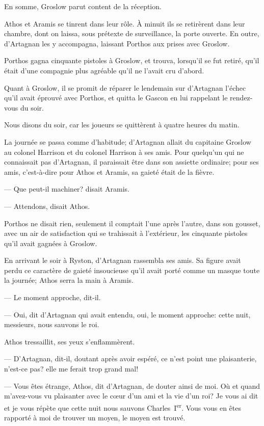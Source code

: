 En somme, Groslow parut content de la réception.

Athos et Aramis se tinrent dans leur rôle. À minuit ils se retirèrent dans leur chambre, dont on laissa, sous prétexte de surveillance, la porte ouverte. En outre, d'Artagnan les y accompagna, laissant Porthos aux prises avec Groslow.

Porthos gagna cinquante pistoles à Groslow, et trouva, lorsqu'il se fut retiré, qu'il était d'une compagnie plus agréable qu'il ne l'avait cru d'abord.

Quant à Groslow, il se promit de réparer le lendemain sur d'Artagnan l'échec qu'il avait éprouvé avec Porthos, et quitta le Gascon en lui rappelant le rendez-vous du soir.

Nous disons du soir, car les joueurs se quittèrent à quatre heures du matin.

La journée se passa comme d'habitude; d'Artagnan allait du capitaine Groslow au colonel Harrison et du colonel Harrison à ses amis. Pour quelqu'un qui ne connaissait pas d'Artagnan, il paraissait être dans son assiette ordinaire; pour ses amis, c'est-à-dire pour Athos et Aramis, sa gaieté était de la fièvre.

— Que peut-il machiner? disait Aramis.

— Attendons, disait Athos.

Porthos ne disait rien, seulement il comptait l'une après l'autre, dans son gousset, avec un air de satisfaction qui se trahissait à l'extérieur, les cinquante pistoles qu'il avait gagnées à Groslow.

En arrivant le soir à Ryston, d'Artagnan rassembla ses amis. Sa figure avait perdu ce caractère de gaieté insoucieuse qu'il avait porté comme un masque toute la journée; Athos serra la main à Aramis.

— Le moment approche, dit-il.

— Oui, dit d'Artagnan qui avait entendu, oui, le moment approche: cette nuit, messieurs, nous sauvons le roi.

Athos tressaillit, ses yeux s'enflammèrent.

— D'Artagnan, dit-il, doutant après avoir espéré, ce n'est point une plaisanterie, n'est-ce pas? elle me ferait trop grand mal!

— Vous êtes étrange, Athos, dit d'Artagnan, de douter ainsi de moi. Où et quand m'avez-vous vu plaisanter avec le cœur d'un ami et la vie d'un roi? Je vous ai dit et je vous répète que cette nuit nous sauvons Charles~I\textsuperscript{er}. Vous vous en êtes rapporté à moi de trouver un moyen, le moyen est trouvé.

